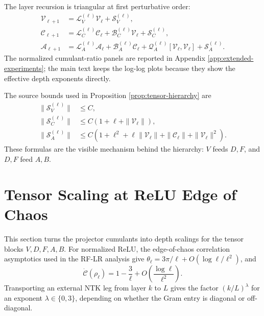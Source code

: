 \documentclass{article}
\begin{document}
The layer recursion is triangular at first perturbative order:
\begin{align}
\mathcal V_{\ell+1}
&=
\mathcal L_V^{(\ell)}\mathcal V_\ell+\mathcal S_V^{(\ell)},\\
\mathcal C_{\ell+1}
&=
\mathcal L_C^{(\ell)}\mathcal C_\ell
+\mathcal B_C^{(\ell)}\mathcal V_\ell
+\mathcal S_C^{(\ell)},\\
\mathcal A_{\ell+1}
&=
\mathcal L_A^{(\ell)}\mathcal A_\ell
+\mathcal B_A^{(\ell)}\mathcal C_\ell
+\mathcal Q_A^{(\ell)}[\mathcal V_\ell,\mathcal V_\ell]
+\mathcal S_A^{(\ell)}.
\label{eq:tensor-triangular-recursion}
\end{align}
The normalized cumulant-ratio panels are reported in Appendix \ref{app:extended-experiments}; the main text keeps the log-log plots because they show the effective depth exponents directly.



The source bounds used in Proposition \ref{prop:tensor-hierarchy} are
\begin{equation}
\begin{aligned}
\|\mathcal S_V^{(\ell)}\|&\le C,\\
\|\mathcal S_C^{(\ell)}\|&\le C(1+\ell+\|\mathcal V_\ell\|),\\
\|\mathcal S_A^{(\ell)}\|
&\le C(1+\ell^2+\ell\|\mathcal V_\ell\|+\|\mathcal C_\ell\|
+\|\mathcal V_\ell\|^2).
\end{aligned}
\label{eq:tensor-source-bounds}
\end{equation}
These formulas are the visible mechanism behind the hierarchy: \(V\) feeds \(D,F\), and \(D,F\) feed \(A,B\).

\section{Tensor Scaling at ReLU Edge of Chaos}
This section turns the projector cumulants into depth scalings for the tensor blocks \(V,D,F,A,B\).
For normalized ReLU, the edge-of-chaos correlation asymptotics used in the RF-LR analysis give
\(\theta_\ell=3\pi/\ell+O(\log \ell/\ell^2)\), and
\begin{equation}
\dot{\mathcal C}(\rho_\ell)=1-\frac3\ell+O\left(\frac{\log\ell}{\ell^2}\right).
\label{eq:relu-transport}
\end{equation}
Transporting an external NTK leg from layer \(k\) to \(L\) gives the factor \((k/L)^\lambda\) for an exponent \(\lambda\in\{0,3\}\), depending on whether the Gram entry is diagonal or off-diagonal.
\end{document}
